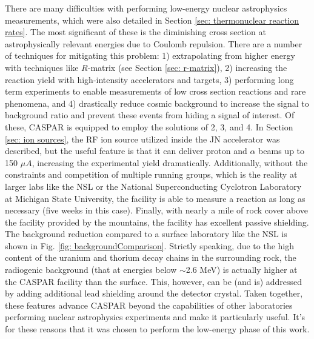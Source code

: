 There are many difficulties with performing low-energy nuclear astrophysics measurements, which were also detailed in Section \ref{sec: thermonuclear reaction rates}. The most significant of these is the diminishing cross section at astrophysically relevant energies due to Coulomb repulsion. There are a number of techniques for mitigating this problem: 1) extrapolating from higher energy with techniques like $R$-matrix (see Section \ref{sec: r-matrix}), 2) increasing the reaction yield with high-intensity accelerators and targets, 3) performing long term experiments to enable measurements of low cross section reactions and rare phenomena, and 4) drastically reduce cosmic background to increase the signal to background ratio and prevent these events from hiding a signal of interest. Of these, CASPAR is equipped to employ the solutions of 2, 3, and 4. In Section \ref{sec: ion sources}, the RF ion source utilized inside the JN accelerator was described, but the useful feature is that it can deliver proton and $\alpha$ beams up to 150 $\mu A$, increasing the experimental yield dramatically. Additionally, without the constraints and competition of multiple running groups, which is the reality at larger labs like the NSL or the National Superconducting Cyclotron Laboratory at Michigan State University, the facility is able to measure a reaction as long as necessary (five weeks in this case). Finally, with nearly a mile of rock cover above the facility provided by the mountains, the facility has excellent passive shielding. The background reduction compared to a surface laboratory like the NSL is shown in Fig. \ref{fig: backgroundComparison}. Strictly speaking, due to the high content of the uranium and thorium decay chains in the surrounding rock, the radiogenic background (that at energies below $\sim$2.6 MeV) is actually higher at the CASPAR facility than the surface. This, however, can be (and is) addressed by adding additional lead shielding around the detector crystal. Taken together, these features advance CASPAR beyond the capabilities of other laboratories performing nuclear astrophysics experiments and make it particularly useful. It's for these reasons that it was chosen to perform the low-energy phase of this work. 


